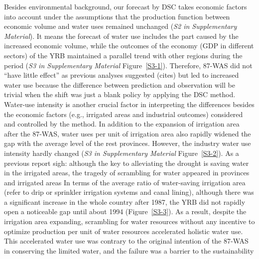 
\label{discussion-1}

Besides environmental background, our forecast by DSC takes economic factors into account under the assumptions that the production function between economic volume and water uses remained unchanged (\textit{S2 in Supplementary Material}).
It means the forecast of water use includes the part caused by the increased economic volume, while the outcomes of the economy (GDP in different sectors) of the YRB maintained a parallel trend with other regions during the period (\textit{S3 in Supplementary Material} Figure~\ref{S3-1}).
Therefore, 87-WAS did not ``have little effect'' as previous analyses suggested (cites) but led to increased water use because the difference between prediction and observation will be trivial when the shift was just a blank policy by applying the DSC method. %
Water-use intensity is another crucial factor in interpreting the differences besides the economic factors (e.g., irrigated areas and industrial outcomes) considered and controlled by the method.
In addition to the expansion of irrigation area after the 87-WAS, water uses per unit of irrigation area also rapidly widened the gap with the average level of the rest provinces. However, the industry water use intensity hardly changed (\textit{S3 in Supplementary Material} Figure~\ref{S3-2}).
As a previous report sigh: although the key to alleviating the drought is saving water in the irrigated areas, the tragedy of scrambling for water appeared in provinces and irrigated areas %
In terms of the average ratio of water-saving irrigation area (refer to drip or sprinkler irrigation systems and canal lining), although there was a significant increase in the whole country after 1987, the YRB did not rapidly open a noticeable gap until about 1994 (Figure~\ref{S3-3}).
As a result, despite the irrigation area expanding, scrambling for water resources without any incentive to optimize production per unit of water resources accelerated holistic water use.
This accelerated water use was contrary to the original intention of the 87-WAS in conserving the limited water, and the failure was a barrier to the sustainability %

